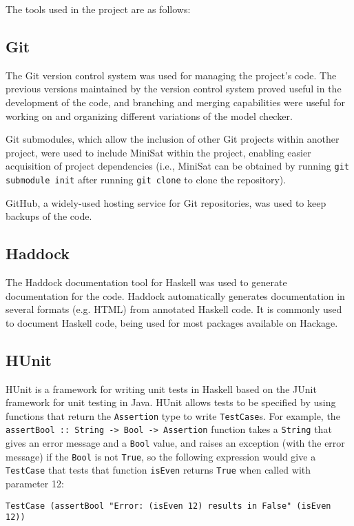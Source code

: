 \documentclass[12pt,a4paper,twoside,openright]{report}
\begin{document}
The tools used in the project are as follows:

\subsection{Git}

The Git version control system was used for managing the project's code. The
previous versions maintained by the version control system proved useful in
the development of the code, and branching and merging capabilities were
useful for working on and organizing different variations of the model checker.

Git submodules, which allow the inclusion of other Git projects within another
project, were used to include MiniSat within the project, enabling easier
acquisition of project dependencies (i.e., MiniSat can be obtained by running
\verb,git submodule init, after running \verb,git clone, to clone the repository).

GitHub, a widely-used hosting service for Git repositories, was used to keep
backups of the code.

\subsection{Haddock}

The Haddock documentation tool for Haskell was used to generate documentation
for the code. Haddock automatically generates documentation in
several formats (e.g. HTML) from annotated Haskell code. It is commonly
used to document Haskell code, being used for most packages available
on Hackage.

\subsection{HUnit}
HUnit is a framework for writing unit tests in Haskell based on the JUnit framework
for unit testing in Java. HUnit allows tests to be specified by using functions
that return the \verb,Assertion, type to write \verb,TestCase,s. For example, the
\verb,assertBool :: String -> Bool -> Assertion, function takes a \verb,String,
that gives an error message and a \verb,Bool, value, and raises an exception (with
the error message) if the \verb,Bool, is not \verb,True,, so the following
expression would give a \verb,TestCase, that tests that function
\verb,isEven, returns \verb,True, when called with parameter 12:
\begin{verbatim}
TestCase (assertBool "Error: (isEven 12) results in False" (isEven 12))
\end{verbatim}
\end{document}
